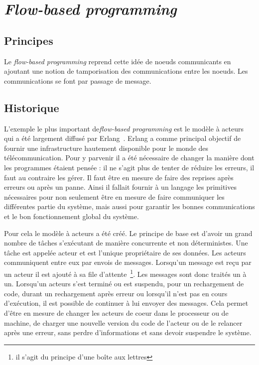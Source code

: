 \documentclass{article}
\begin{document}
\section{\emph{Flow-based programming}}\label{flow-based}

\subsection{Principes}\label{principes}

Le \emph{flow-based programming} reprend cette idée de noeuds
communicants en ajoutant une notion de tamporisation des communications
entre les noeuds. Les communications se font par passage de message.

\subsection{Historique}\label{historique}
L'exemple le plus important de\emph{flow-based programming} est le modèle à acteurs~\cite{actors}
qui a été largement diffusé par Erlang~\cite{erlang}.
Erlang a comme principal objectif de fournir une infrastructure hautement disponible
pour le monde des télécommunication.
Pour y parvenir il a été nécessaire de changer la manière dont les programmes étaient pensée :
il ne s'agit plus de tenter de réduire les erreurs, il faut au contraire les gérer.
Il faut être en mesure de faire des reprises après erreurs ou après un panne.
Ainsi il fallait fournir à un langage les primitives nécessaires pour non seulement
être en mesure de faire communiquer les différentes partie du système, mais aussi
pour garantir les bonnes communications et le bon fonctionnement global du système.

Pour cela le modèle à acteurs a été créé. Le principe de base est d'avoir un grand
nombre de tâches s'exécutant de manière concurrente et non déterministes.
Une tâche est appelée acteur et est l'unique propriétaire de ses données.
Les acteurs communiquent entre eux par envois de messages.
Lorsqu'un message est reçu par un acteur il est ajouté à sa file d'attente~\footnote{il s'agit du principe d'une boîte aux lettres}.
Les messages sont donc traités un à un.
Lorsqu'un acteurs s'est terminé ou est suspendu, pour un rechargement de code, durant
un rechargement après erreur ou lorsqu'il n'est pas en cours d'exécution, il est possible
de continuer à lui envoyer des messages.
Cela permet d'être en mesure de changer les acteurs de coeur dans le processeur ou
de machine, de charger une nouvelle version du code de l'acteur ou de le relancer
après une erreur, sans perdre d'informations et sans devoir suspendre le système.
\end{document}
